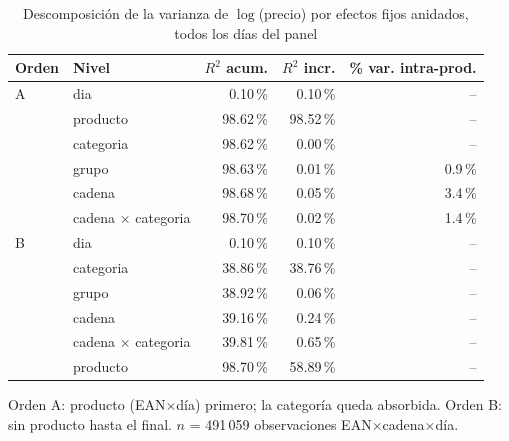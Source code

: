 \begin{table}[htbp]
\caption{Descomposici\'on de la varianza de $\log$(precio) por efectos fijos anidados, todos los d\'ias del panel}
\label{tab:varianza}
\centering\scriptsize\setlength{\tabcolsep}{3pt}
\begin{tabular}{@{}llrrr@{}}
\toprule
Orden & Nivel & $R^2$ acum. & $R^2$ incr. & \% var. intra-prod. \\
\midrule
A & dia & 0.10\,\% & 0.10\,\% & -- \\
 & producto & 98.62\,\% & 98.52\,\% & -- \\
 & categoria & 98.62\,\% & 0.00\,\% & -- \\
 & grupo & 98.63\,\% & 0.01\,\% & 0.9\,\% \\
 & cadena & 98.68\,\% & 0.05\,\% & 3.4\,\% \\
 & cadena $\times$ categoria & 98.70\,\% & 0.02\,\% & 1.4\,\% \\
\midrule
B & dia & 0.10\,\% & 0.10\,\% & -- \\
 & categoria & 38.86\,\% & 38.76\,\% & -- \\
 & grupo & 38.92\,\% & 0.06\,\% & -- \\
 & cadena & 39.16\,\% & 0.24\,\% & -- \\
 & cadena $\times$ categoria & 39.81\,\% & 0.65\,\% & -- \\
 & producto & 98.70\,\% & 58.89\,\% & -- \\
\bottomrule\end{tabular}
\par\smallskip\raggedright\scriptsize Orden A: producto (EAN$\times$d\'ia) primero; la categor\'ia queda absorbida. Orden B: sin producto hasta el final. $n$ = 491\,059 observaciones EAN$\times$cadena$\times$d\'ia.
\end{table}
